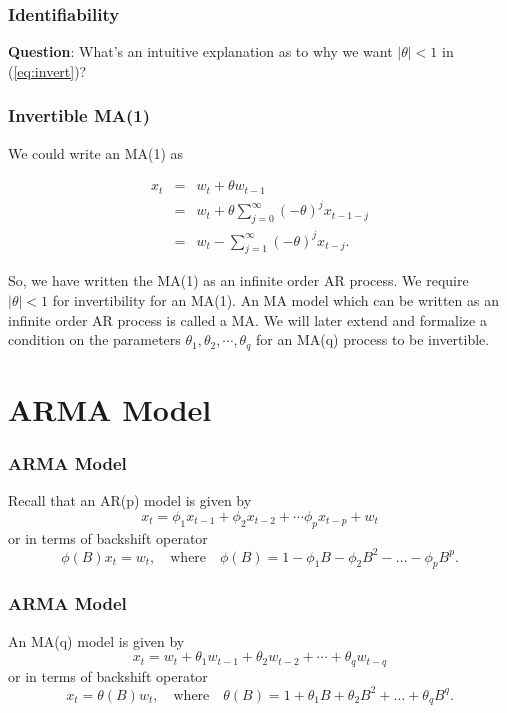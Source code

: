 \documentclass[%
xcolor=pdftex]{beamer}
\begin{document}
\begin{frame}
\frametitle{Identifiability}

\textbf{Question}: What's an intuitive explanation as to why we want $|\theta|<1$ in (\ref{eq:invert})?

\vspace{60mm}

\end{frame}



\begin{frame}
\frametitle{Invertible MA(1)}

We could write an MA(1) as

\begin{eqnarray*}
 x_t &=& w_t + \theta w_{t-1} \\
     &=& w_t +\theta \sum_{j=0}^\infty (-\theta)^j x_{t-1-j}\\
     &=&  w_t - \sum_{j=1}^\infty (-\theta)^j x_{t-j}.
\end{eqnarray*}

 So, we have written the MA(1) as an infinite order AR process. We require $|\theta|<1$ for invertibility for an MA(1). An MA model which can be written as an infinite order AR process is called a \underline{\hspace{15 mm}} MA.  We will later extend and formalize a condition on the parameters $\theta_1, \theta_2, \cdots, \theta_q$ for an MA(q) process to be invertible.




\end{frame}

\section{ARMA Model}
\frame{\tableofcontents[currentsection]}

\begin{frame}
\frametitle{ARMA Model}

Recall that an AR(p) model is given by
 $$
 x_t=\phi_1 x_{t-1} +\phi_2 x_{t-2} + \cdots \phi_p x_{t-p} + w_t
 $$
 or in terms of backshift operator
 $$
\phi(B) x_t =w_t, \quad \mbox{where} \quad \phi(B)=1-\phi_1 B-\phi_2 B^2-\ldots-\phi_p B^p.
$$

\end{frame}

\begin{frame}
\frametitle{ARMA Model}

An MA(q) model is given by
$$
x_t = w_t + \theta_1 w_{t-1} + \theta_2 w_{t-2} + \cdots + \theta_q w_{t-q}
$$
or in terms of backshift operator
$$
x_t =  \theta(B)w_t, \quad \mbox{where} \quad \theta(B)=1+\theta_1 B+\theta_2 B^2 +\ldots + \theta_q B^q.
$$

\end{frame}
\end{document}
